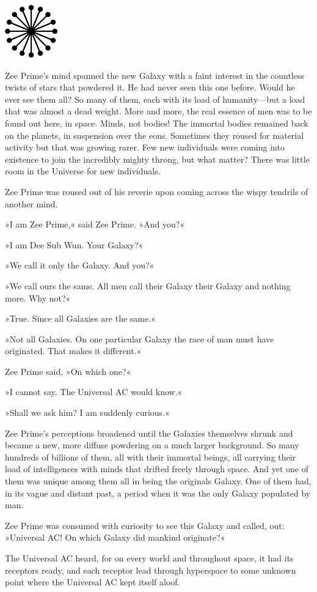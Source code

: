 \documentclass[11pt,twocolumn,paper=a5,pagesize,twoside]{article}
\newcommand{\q}[1]{»#1«}
\newcommand{\futurethree}[1]{ #1 }
\newcommand{\sepc}[0]{\vspace{.8cm} {\centering 

\includegraphics[scale=1.00]{blackor/o3.pdf}

}\vspace{.8cm}}
\newcommand{\initial}[1]{ \lettrine[lines=3,lhang=0.3,nindent=0em]{  {\textsf{#1}}}{}}
\begin{document}
\sepc{}

\futurethree{
\initial{Z}ee Prime's mind spanned the new Galaxy with a faint interest in the 
countless twists of stars that powdered it. He had never seen this one before. 
Would he ever see them all? So many of them, each with its load of 
humanity---but a load that was almost a dead weight. More and more, the real 
essence of men was to be found out here, in space.
Minds, not bodies! The immortal bodies remained back on the planets, in 
suspension over the eons. Sometimes they roused for material activity but that 
was growing rarer. Few new individuals were coming into existence to join the 
incredibly mighty throng, but what matter? There was little room in the 
Universe for new individuals.

Zee Prime was roused out of his reverie upon coming across the wispy tendrils 
of another mind.

\q{I am Zee Prime,} said Zee Prime. \q{And you?}

\q{I am Dee Sub Wun. Your Galaxy?}

\q{We call it only the Galaxy. And you?}

\q{We call ours the same. All men call their Galaxy their Galaxy and nothing 
more. Why not?}

\q{True. Since all Galaxies are the same.}

\q{Not all Galaxies. On one particular Galaxy the race of man must have 
originated. That makes it different.}

Zee Prime said, \q{On which one?}

\q{I cannot say. The Universal AC would know.}

\q{Shall we ask him? I am suddenly curious.}

Zee Prime's perceptions broadened until the Galaxies themselves shrunk and 
became a new, more diffuse powdering on a much larger background. So many 
hundreds of billions of them, all with their immortal beings, all carrying 
their load of intelligences with minds that drifted freely through space. 
And yet one of them was unique among them all in being the originals 
Galaxy. One of them had, in its vague and distant past, a period when it 
was the only Galaxy populated by man.

Zee Prime was consumed with curiosity to see this Galaxy and called, out: 
\q{Universal AC! On which Galaxy did mankind originate?}

The Universal AC heard, for on every world and throughout space, it had its 
receptors ready, and each receptor lead through hyperspace to some unknown 
point where the Universal AC kept itself aloof.

}
\end{document}
